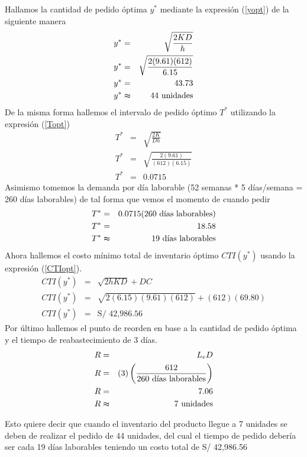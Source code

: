 Hallamos la cantidad de pedido óptima $y^*$ mediante la expresión (\ref{yopt}) de la siguiente manera
\begin{eqnarray}
    y^* &=& \sqrt{\frac{2KD}{h}} \nonumber \\
    y^* &=& \sqrt{\frac{2(9.61)(612)}{6.15}} \nonumber \\
    y^* &=& 43.73 \nonumber \\
    y^* &\thickapprox& 44 \text{ unidades} \nonumber
\end{eqnarray}
De la misma forma hallemos el intervalo de pedido óptimo $T^*$ utilizando la expresión (\ref{Topt}) 
\begin{eqnarray}
    T^* &=& \sqrt{\frac{2K}{Dh}} \nonumber \\
    T^* &=& \sqrt{\frac{2(9.61)}{(612)(6.15)}} \nonumber \\
    T^* &=& 0.0715 \nonumber
\end{eqnarray}
Asimismo tomemos la demanda por día laborable (52 semanas * 5 días/semana = 260 días laborables) de tal forma que vemos el momento de cuando pedir
\begin{eqnarray}
    T^* &=& 0.0715 (260 \text{ días laborables}) \nonumber \\   
    T^* &=& 18.58 \nonumber \\
    T^* &\thickapprox& 19 \text{ días laborables} \nonumber
\end{eqnarray}
Ahora hallemos el costo mínimo total de inventario óptimo $CTI(y^*)$ usando la expresión (\ref{CTIopt}).
\begin{eqnarray}
    CTI(y^*) &=& \sqrt{2hKD} + DC \nonumber \\
    CTI(y^*) &=& \sqrt{2(6.15)(9.61)(612)} + (612)(69.80) \nonumber \\
    CTI(y^*) &=& \text{S/ 42,986.56} \nonumber
\end{eqnarray}
\clearpage
\noindent Por último hallemos el punto de reorden en base a la cantidad de pedido óptima y el tiempo de reabastecimiento de 3 días.
\begin{eqnarray}
    R &=& L_e D \nonumber \\
    R &=& (3) \left(\frac{612}{260 \text{ días laborables}} \right) \nonumber \\
    R &=& 7.06 \nonumber \\
    R &\thickapprox& 7 \text{ unidades} \nonumber
\end{eqnarray}

Esto quiere decir que cuando el inventario del producto llegue a 7 unidades se deben de realizar el pedido de 44 unidades, del cual el tiempo de pedido debería ser cada 19 días laborables teniendo un costo total de S/ 42,986.56

